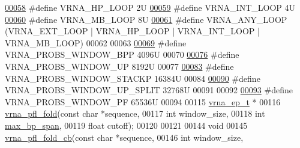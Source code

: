\begin{DoxyCode}
\mbox{\hyperlink{_l_pfold_8h_a30170811c320f3a7b23ffff3b3343b91}{00058}} \textcolor{preprocessor}{#define VRNA\_HP\_LOOP    2U}
\mbox{\hyperlink{_l_pfold_8h_a956a237e7d956b684b7d593cb3eca665}{00059}} \textcolor{preprocessor}{#define VRNA\_INT\_LOOP   4U}
\mbox{\hyperlink{_l_pfold_8h_ad905b71f02b3799eb84b490435aec837}{00060}} \textcolor{preprocessor}{#define VRNA\_MB\_LOOP    8U}
\mbox{\hyperlink{_l_pfold_8h_a1fef1ad234755db78ab6b695edce5080}{00061}} \textcolor{preprocessor}{#define VRNA\_ANY\_LOOP   (VRNA\_EXT\_LOOP | VRNA\_HP\_LOOP | VRNA\_INT\_LOOP | VRNA\_MB\_LOOP)}
00062 
00063 
\mbox{\hyperlink{group__local__pf__fold_ga296217b76e76e5f7e6927e7210aa9b1f}{00069}} \textcolor{preprocessor}{#define VRNA\_PROBS\_WINDOW\_BPP  4096U}
00070 
\mbox{\hyperlink{group__local__pf__fold_ga18325811c7dfc7b7d9d4ac37f4353615}{00076}} \textcolor{preprocessor}{#define VRNA\_PROBS\_WINDOW\_UP   8192U}
00077 
\mbox{\hyperlink{group__local__pf__fold_ga0a13fc668b02f21b225e2334e4caac08}{00083}} \textcolor{preprocessor}{#define VRNA\_PROBS\_WINDOW\_STACKP   16384U}
00084 
\mbox{\hyperlink{group__local__pf__fold_ga9068f4ec008bf1c042a9357f5c2c5e13}{00090}} \textcolor{preprocessor}{#define VRNA\_PROBS\_WINDOW\_UP\_SPLIT   32768U}
00091 
00092 
\mbox{\hyperlink{_l_pfold_8h_a4b79137d9b28b1f9cac7983792ce34a0}{00093}} \textcolor{preprocessor}{#define VRNA\_PROBS\_WINDOW\_PF        65536U}
00094 
00115 \mbox{\hyperlink{group__struct__utils_structvrna__elem__prob__s}{vrna\_ep\_t}} *
00116 \mbox{\hyperlink{group__local__pf__fold_ga6267230f20cab0e2315375310b4dad85}{vrna\_pfl\_fold}}(\textcolor{keyword}{const} \textcolor{keywordtype}{char}  *sequence,
00117               \textcolor{keywordtype}{int}         window\_size,
00118               \textcolor{keywordtype}{int}         \mbox{\hyperlink{group__model__details_ga18df869af0d70101106458fc3f027806}{max\_bp\_span}},
00119               \textcolor{keywordtype}{float}       cutoff);
00120 
00121 
00144 \textcolor{keywordtype}{void}
00145 \mbox{\hyperlink{group__local__pf__fold_ga8dc3788e66420f524f2bfc0b685a939d}{vrna\_pfl\_fold\_cb}}(\textcolor{keyword}{const} \textcolor{keywordtype}{char}                 *sequence,
00146                  \textcolor{keywordtype}{int}                        window\_size,

\end{DoxyCode}
